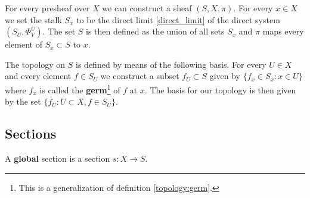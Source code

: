 	
	\begin{construct}\label{sheaf:associated_construction}
		For every presheaf over $X$ we can construct a sheaf $(S, X, \pi)$. For every $x\in X$ we set the stalk $S_x$ to be the direct limit \ref{direct_limit} of the direct system $(S_U, \Phi^U_V)$. The set $S$ is then defined as the union of all sets $S_x$ and $\pi$ maps every element of $S_x\subset S$ to $x$.
		
		The topology on $S$ is defined by means of the following basis. For every $U\in X$ and every element $f\in S_U$ we construct a subset $f_U\subset S$ given by $\{f_x\in S_x:x\in U\}$ where $f_x$ is called the \textbf{germ}\footnote{This is a generalization of definition \ref{topology:germ}.} of $f$ at $x$. The basis for our topology is then given by the set $\{f_U:U\subset X, f\in S_U\}$.
	\end{construct}
	
\subsection{Sections}{
	\begin{remark*}
		A \textbf{global} section is a section $s:X\rightarrow S$.
	\end{remark*}
}
